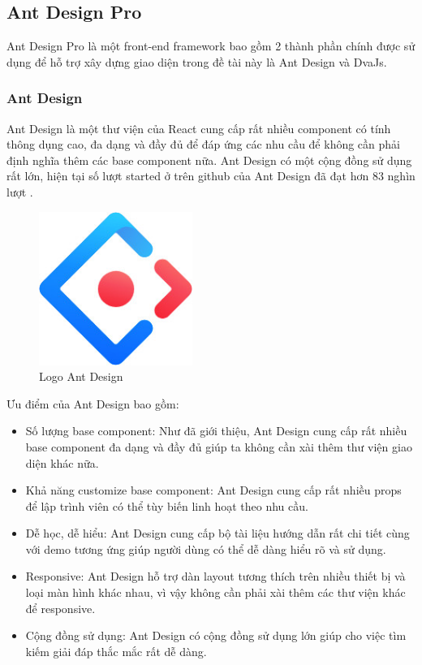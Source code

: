 \subsection{Ant Design Pro}
    \hspace*{0.5cm} Ant Design Pro là một front-end framework bao gồm 2 thành phần chính được sử dụng để hỗ trợ xây dựng giao diện trong đề tài này là Ant Design và DvaJs.
    \subsubsection{Ant Design}
    \hspace*{0.5cm} Ant Design là một thư viện của React cung cấp rất nhiều component có tính thông dụng cao, đa dạng và đầy đủ để đáp ứng các nhu cầu để không cần phải định nghĩa thêm các base component nữa. Ant Design có một cộng đồng sử dụng rất lớn, hiện tại số lượt started ở trên github của Ant Design đã đạt hơn 83 nghìn lượt \cite{technologyAntdStar}.
   
    \begin{figure}[!htp]
        \begin{center}
        \includegraphics[width=5cm]{img/Technology/antd.jpg}
        \end{center}
        \caption{Logo Ant Design \cite{technologyAntd}}
    \end{figure}

    \hspace*{0.5cm} Ưu điểm của Ant Design bao gồm:
    \begin{itemize}
        \item Số lượng base component: Như đã giới thiệu, Ant Design cung cấp rất nhiều base component đa dạng và đầy đủ giúp ta không cần xài thêm thư viện giao diện khác nữa.
        \item Khả năng customize base component: Ant Design cung cấp rất nhiều props để lập trình viên có thể tùy biến linh hoạt theo nhu cầu.
        \item Dễ học, dễ hiểu: Ant Design cung cấp bộ tài liệu hướng dẫn rất chi tiết cùng với demo tương ứng giúp người dùng có thể dễ dàng hiểu rõ và sử dụng.
        \item Responsive: Ant Design hỗ trợ dàn layout tương thích trên nhiều thiết bị và loại màn hình khác nhau, vì vậy không cần phải xài thêm các thư viện khác để responsive.
        \item Cộng đồng sử dụng: Ant Design có cộng đồng sử dụng lớn giúp cho việc tìm kiếm giải đáp thắc mắc rất dễ dàng.
    \end{itemize}

